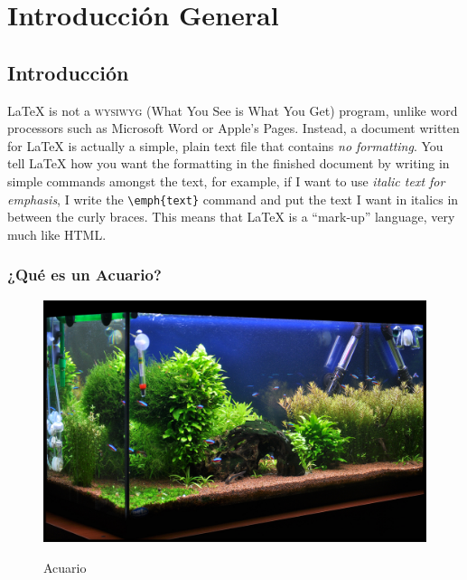 
\chapter{Introducción General} %

\label{Chapter1} %
\label{IntroGeneral}


\newcommand{\keyword}[1]{\textbf{#1}}
\newcommand{\tabhead}[1]{\textbf{#1}}
\newcommand{\code}[1]{\texttt{#1}}
\newcommand{\file}[1]{\texttt{\bfseries#1}}
\newcommand{\option}[1]{\texttt{\itshape#1}}


\section{Introducción}

\LaTeX{} is not a \textsc{wysiwyg} (What You See is What You Get) program, unlike word processors such as Microsoft Word or Apple's Pages. Instead, a document written for \LaTeX{} is actually a simple, plain text file that contains \emph{no formatting}. You tell \LaTeX{} how you want the formatting in the finished document by writing in simple commands amongst the text, for example, if I want to use \emph{italic text for emphasis}, I write the \verb|\emph{text}| command and put the text I want in italics in between the curly braces. This means that \LaTeX{} is a \enquote{mark-up} language, very much like HTML.

\subsection{¿Qué es un Acuario?}

	\begin{figure}[]
		\centering
	    \includegraphics[width=.5\textwidth]{./Figures/acuarioHobby3.jpg}
		\label{fig.acuarioHobby}
		\caption{Acuario}
	\end{figure}       

